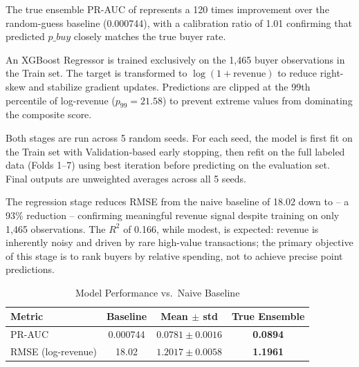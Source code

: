 \documentclass[conference]{IEEEtran}
\begin{document}
The true ensemble PR-AUC of  represents a
120 times improvement over the random-guess baseline (0.000744),
with a calibration ratio of 1.01 confirming that predicted
$p\_buy$ closely matches the true buyer rate.

\vspace{0.5em}
\noindent{}
\vspace{0.3em}

An XGBoost Regressor is trained exclusively on the 1,465 buyer
observations in the Train set. The target is transformed to
$\log(1 + \text{revenue})$ to reduce right-skew and stabilize
gradient updates. Predictions are clipped at the 99th percentile
of log-revenue ($p_{99} = 21.58$) to prevent extreme values from
dominating the composite score.

Both stages are run across 5 random seeds. For each seed, the model
is first fit on the Train set with Validation-based early stopping,
then refit on the full labeled data (Folds 1--7) using best iteration before predicting on the evaluation set.
Final outputs are unweighted averages across all 5 seeds.

The regression stage reduces RMSE from the naive baseline of 18.02
down to  -- a 93\% reduction -- confirming
meaningful revenue signal despite training on only 1,465
observations. The $R^2$ of 0.166, while modest, is expected: revenue
is inherently noisy and driven by rare high-value transactions; the
primary objective of this stage is to rank buyers by relative
spending, not to achieve precise point predictions.

\begin{table}[H]
\centering
\caption{Model Performance vs.\ Naive Baseline}
\label{tab:model_results}
\renewcommand{\arraystretch}{1.2}
\setlength{\tabcolsep}{5pt}
\footnotesize
\begin{tabular}{|l c c c|}
\toprule
\textbf{Metric} & \textbf{Baseline} & \textbf{Mean $\pm$ std}
  & \textbf{True Ensemble} \\
\midrule
PR-AUC
  & 0.000744 & $0.0781 \pm 0.0016$ & \textbf{0.0894} \\
RMSE (log-revenue)
  & 18.02 & $1.2017 \pm 0.0058$ & \textbf{1.1961} \\
\bottomrule
\end{tabular}
\end{table}

\vspace{0.5em}
\noindent{}
\vspace{0.3em}
\end{document}
